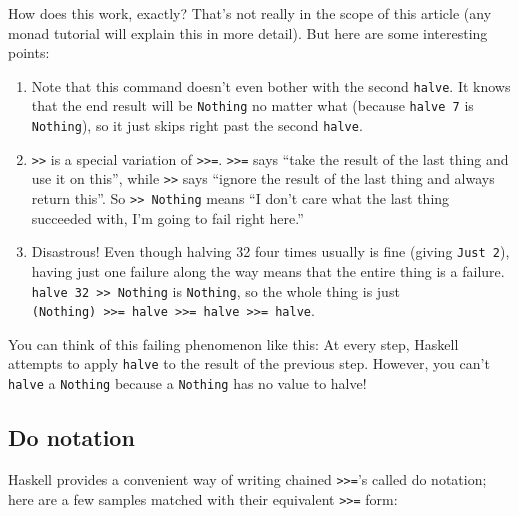 \documentclass[]{article}
\begin{document}
How does this work, exactly? That's not really in the scope of this article (any monad tutorial will
explain this in more detail). But here are some interesting points:

\begin{enumerate}
\def\labelenumi{\arabic{enumi}.}
\tightlist
\item
  Note that this command doesn't even bother with the second \texttt{halve}. It knows that the end
  result will be \texttt{Nothing} no matter what (because \texttt{halve\ 7} is \texttt{Nothing}), so
  it just skips right past the second \texttt{halve}.
\item
  \texttt{\textgreater{}\textgreater{}} is a special variation of
  \texttt{\textgreater{}\textgreater{}=}. \texttt{\textgreater{}\textgreater{}=} says ``take the
  result of the last thing and use it on this'', while \texttt{\textgreater{}\textgreater{}} says
  ``ignore the result of the last thing and always return this''. So
  \texttt{\textgreater{}\textgreater{}\ Nothing} means ``I don't care what the last thing succeeded
  with, I'm going to fail right here.''
\item
  Disastrous! Even though halving 32 four times usually is fine (giving \texttt{Just\ 2}), having
  just one failure along the way means that the entire thing is a failure.
  \texttt{halve\ 32\ \textgreater{}\textgreater{}\ Nothing} is \texttt{Nothing}, so the whole thing
  is just
  \texttt{(Nothing)\ \textgreater{}\textgreater{}=\ halve\ \textgreater{}\textgreater{}=\ halve\ \textgreater{}\textgreater{}=\ halve}.
\end{enumerate}

You can think of this failing phenomenon like this: At every step, Haskell attempts to apply
\texttt{halve} to the result of the previous step. However, you can't \texttt{halve} a
\texttt{Nothing} because a \texttt{Nothing} has no value to halve!

\subsection{Do notation}\label{do-notation}

Haskell provides a convenient way of writing chained \texttt{\textgreater{}\textgreater{}=}'s called
do notation; here are a few samples matched with their equivalent
\texttt{\textgreater{}\textgreater{}=} form:
\end{document}

